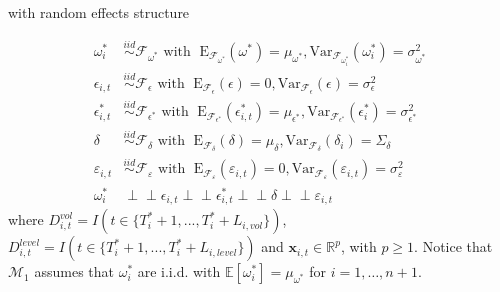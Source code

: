 \documentclass[11pt]{article}
\newcommand{\x}{\textbf{x}}
\newcommand{\simiid}{\stackrel{iid}{\sim}} %
\newcommand{\indep}{\perp \!\!\! \perp } %
\def\mrm#1{\mathrm{#1}} %
\def\mc#1{\mathcal{#1}} %
\def\E{\mathbb{E}} %
\def\mc#1{\mathcal{#1}}
\theoremstyle{definition}
\begin{document}
  with random effects structure

  \begin{align*}
    \omega^{*}_i &\simiid \mc{F}_{\omega^{*}} \text{ with }  \; \mrm{E}_{\mc{F}_{\omega^{*}}}(\omega^{*}) = \mu_{\omega^{*}}, \mrm{Var}_{\mc{F}_{\omega^{*}_i}}(\omega^{*}_i)  = \sigma^2_{\omega^{*}}  \\
    \epsilon_{i,t} &\simiid \mc{F}_{\epsilon} \text{ with }  \; \mrm{E}_{\mc{F}_{\epsilon}}(\epsilon) = 0, \mrm{Var}_{\mc{F}_{\epsilon}}(\epsilon)  = \sigma^2_{\epsilon}  \\
    \epsilon^{*}_{i,t} &\simiid \mc{F}_{\epsilon^{*}} \text{ with }  \; \mrm{E}_{\mc{F}_{\epsilon^{*}}}(\epsilon^{*}_{i,t}) = \mu_{\epsilon^{*}}, \mrm{Var}_{\mc{F}_{\epsilon^{*}}}(\epsilon^{*}_i)  = \sigma^2_{\epsilon^{*}}  \\
    \delta &\simiid \mc{F}_{\delta} \text{ with }  \; \mrm{E}_{\mc{F}_{\delta}}(\delta) = \mu_{\delta}, \mrm{Var}_{\mc{F}_{\delta}}(\delta_i)  = \Sigma_{\delta} \\
    \varepsilon_{i,t} & \simiid  \mc{F}_{\varepsilon} \text{ with }  \; \mrm{E}_{\mc{F}_{\varepsilon}}(\varepsilon_{i,t}) = 0, \mrm{Var}_{\mc{F}_{\varepsilon}}(\varepsilon_{i,t}) = \sigma^2_{\varepsilon}\\
    \omega^{*}_i & \indep  \epsilon_{i,t} \indep  \epsilon^{*}_{i,t} \indep \delta \indep \varepsilon_{i,t}
    \end{align*}
where $D^{vol}_{i,t} = I(t \in \{T_i^* + 1,...,T_i^* + L_{i, vol}\})$, $D^{level}_{i,t} = I(t \in \{T_i^* + 1,...,T_i^* + L_{i, level}\})$ 
and $\x_{i,t} \in \mathbb{R}^{p}$, with $p \geq 1$.  Notice that $\mc{M}_1$ assumes that $\omega^{*}_i$ are i.i.d. with $\E[ \omega^{*}_i]=\mu_{\omega^{*}}$ for $i = 1, \ldots, n+1$. 
\end{document}
